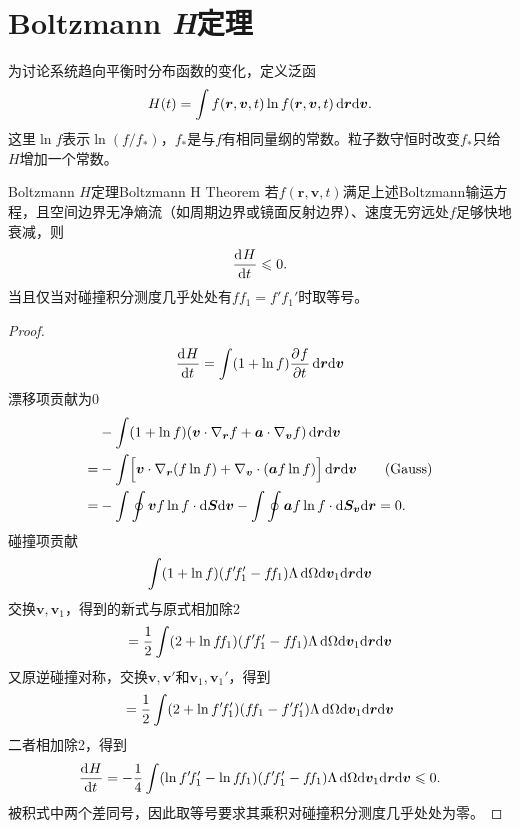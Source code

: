 \section{Boltzmann \textit{H}定理}
为讨论系统趋向平衡时分布函数的变化，定义泛函
\begin{align}
	H(t) = \int f(\bm r,\bm v,t)\ln f(\bm r,\bm v,t)\mathop{}\!\mathrm{d}\bm r\mathrm{d}\bm v.
\end{align}
这里$\ln f$表示$\ln(f/f_\ast)$，$f_\ast$是与$f$有相同量纲的常数。粒子数守恒时改变$f_\ast$只给$H$增加一个常数。
\begin{theorem}{Boltzmann $H$定理}{Boltzmann H Theorem}
	若$f(\bm r,\bm v,t)$满足上述Boltzmann输运方程，且空间边界无净熵流（如周期边界或镜面反射边界）、速度无穷远处$f$足够快地衰减，则
	\begin{align}
		\frac{\mathop{}\!\mathrm{d}^{}H}{\mathrm{d}{t}^{}} \leqslant 0.
	\end{align}
	当且仅当对碰撞积分测度几乎处处有$f\!f_1 = f'\!f_1'$时取等号。
\end{theorem}
\begin{proof}
	\begin{align*}
		\frac{\mathop{}\!\mathrm{d}^{}H}{\mathrm{d}{t}^{}} = \int(1 + \ln f)\frac{\partial^{}f}{\partial{t}^{}}\mathop{}\!\mathrm{d}\bm r\mathrm{d}\bm v
	\end{align*}
	漂移项贡献为0
	\begin{align*}
		&-\int(1 + \ln f)(\bm v \cdot \nabla_{\bm r}f + \bm a \cdot \nabla_{\bm v}f)\mathop{}\!\mathrm{d}\bm r\mathrm{d}\bm v\\
		=&-\int\Bigl[\bm v \cdot \nabla_{\bm r}(f\ln f) + \nabla_{\bm v} \cdot (\bm a f\ln f)\Bigr]\mathop{}\!\mathrm{d}\bm r\mathrm{d}\bm v\tag{Gauss}\\
		=&-\int\oint \bm v f\ln f \cdot \mathop{}\!\mathrm{d}\bm S\mathrm{d}\bm v - \int\oint\bm af\ln f \cdot \mathop{}\!\mathrm{d}\bm S_{\bm v}\mathrm{d}\bm r = 0.
	\end{align*}
	碰撞项贡献
	\begin{align*}
		\int (1 + \ln f)(f'\!f_1' - f\!f_1)\Lambda\mathop{}\!\mathrm{d}\Omega\mathrm{d}\bm v_1\mathrm{d}\bm r\mathrm{d}\bm v
	\end{align*}
	交换$\bm v,\bm v_1$，得到的新式与原式相加除2
	\[
		= \frac12\int (2 + \ln f\!f_1)(f'\!f_1' - f\!f_1)\Lambda\mathop{}\!\mathrm{d}\Omega\mathrm{d}\bm v_1\mathrm{d}\bm r\mathrm{d}\bm v
	\]
	又原逆碰撞对称，交换$\bm v,\bm v'$和$\bm v_1,\bm v_1'$，得到
	\[
		= \frac12\int (2 + \ln f'\!f_1')(f\!f_1 - f'\!f_1')\Lambda\mathop{}\!\mathrm{d}\Omega\mathrm{d}\bm v_1\mathrm{d}\bm r\mathrm{d}\bm v
	\]
	二者相加除2，得到
	\begin{align}
		\frac{\mathop{}\!\mathrm{d}^{}H}{\mathrm{d}{t}^{}} = -\frac14\int (\ln f'\!f_1' - \ln f\!f_1)(f'\!f_1' - f\!f_1)\Lambda\mathop{}\!\mathrm{d}\Omega\mathrm{d}\bm v_1\mathrm{d}\bm r\mathrm{d}\bm v \leqslant 0.
	\end{align}
	被积式中两个差同号，因此取等号要求其乘积对碰撞积分测度几乎处处为零。
\end{proof}

